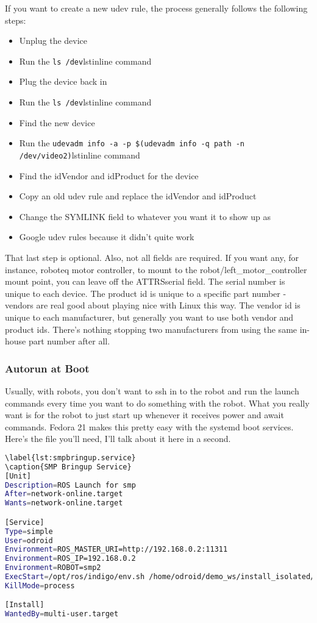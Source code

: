 If you want to create a new udev rule, the process generally follows the following steps:

\begin{itemize}
\item{Unplug the device}
\item{Run the \lstinline{ls /dev}lstinline{} command}
\item{Plug the device back in}
\item{Run the \lstinline{ls /dev}lstinline{} command}
\item{Find the new device}
\item{Run the \lstinline{udevadm info -a -p $(udevadm info -q path -n /dev/video2)}lstinline{} command}
\item{Find the idVendor and idProduct for the device}
\item{Copy an old udev rule and replace the idVendor and idProduct}
\item{Change the SYMLINK field to whatever you want it to show up as}
\item{Google udev rules because it didn't quite work}
\end{itemize}

That last step is optional. Also, not all fields are required. If you want any, for instance, roboteq motor controller, to mount to the robot/left\_motor\_controller mount point, you can leave off the ATTRS{serial} field. The serial number is unique to each device. The product id is unique to a specific part number - vendors are real good about playing nice with Linux this way. The vendor id is unique to each manufacturer, but generally you want to use both vendor and product ids. There's nothing stopping two manufacturers from using the same in-house part number after all.

\subsubsection{Autorun at Boot}

Usually, with robots, you don't want to ssh in to the robot and run the launch commands every time you want to do something with the robot. What you really want is for the robot to just start up whenever it receives power and await commands. Fedora 21 makes this pretty easy with the systemd boot services. Here's the file you'll need, I'll talk about it here in a second.

\begin{lstlisting}[language=bash]
\label{lst:smpbringup.service}
\caption{SMP Bringup Service}
[Unit]
Description=ROS Launch for smp
After=network-online.target
Wants=network-online.target

[Service]
Type=simple
User=odroid
Environment=ROS_MASTER_URI=http://192.168.0.2:11311
Environment=ROS_IP=192.168.0.2
Environment=ROBOT=smp2
ExecStart=/opt/ros/indigo/env.sh /home/odroid/demo_ws/install_isolated/env.sh roslaunch smp_bringup smp.launch --wait
KillMode=process

[Install]
WantedBy=multi-user.target
\end{lstlisting}

